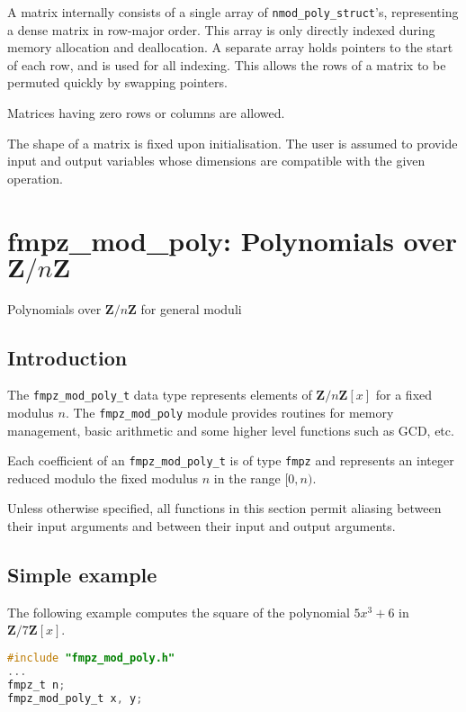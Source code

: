 \documentclass[a4paper,10pt]{book}
\newcommand{\Z}{\mathbf{Z}}%
\newcommand{\code}{\lstinline}
\begin{document}
{{A matrix internally consists of a single array
of \code{nmod_poly_struct}'s, representing a dense matrix in
row-major order. This array is only directly indexed
during memory allocation and deallocation. A separate array
holds pointers to the start of each row, and is used for all
indexing. This allows the rows of a matrix to be permuted
quickly by swapping pointers.

Matrices having zero rows or columns are allowed.

The shape of a matrix is fixed upon initialisation.
The user is assumed to provide input and output variables
whose dimensions are compatible with the given operation.




\chapter{fmpz\_mod\_poly: Polynomials over $\Z/n\Z$}
\epigraph{Polynomials over $\Z / n \Z$ for general moduli}{}

\section{Introduction}

The \code{fmpz_mod_poly_t} data type represents elements of $\Z/n\Z[x]$ for
a fixed modulus $n$. The \code{fmpz_mod_poly} module provides routines for
memory management, basic arithmetic and some higher level functions
such as GCD, etc.

Each coefficient of an \code{fmpz_mod_poly_t} is of type \code{fmpz}
and represents an integer reduced modulo the fixed modulus $n$ in the
range $[0,n)$.

Unless otherwise specified, all functions in this section permit aliasing
between their input arguments and between their input and output arguments.

\section{Simple example}

The following example computes the square of the polynomial $5x^3 + 6$
in $\Z/7\Z[x]$.
\begin{lstlisting}[language=c]
#include "fmpz_mod_poly.h"
...
fmpz_t n;
fmpz_mod_poly_t x, y;


\end{lstlisting}}}
\end{document}
